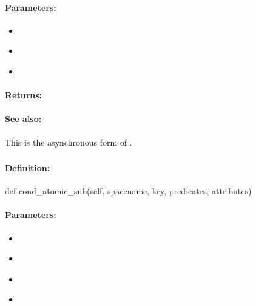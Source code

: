 \paragraph{Parameters:}
\begin{itemize}[noitemsep]
\item {}\\

\item {}\\

\item {}\\

\end{itemize}

\paragraph{Returns:}


\paragraph{See also:}  This is the asynchronous form of .

\pagebreak
\subsubsection{}
\label{api:python:cond_atomic_sub}


\paragraph{Definition:}
\begin{pythoncode}
def cond_atomic_sub(self, spacename, key, predicates, attributes)
\end{pythoncode}

\paragraph{Parameters:}
\begin{itemize}[noitemsep]
\item {}\\

\item {}\\

\item {}\\

\item {}\\

\end{itemize}

